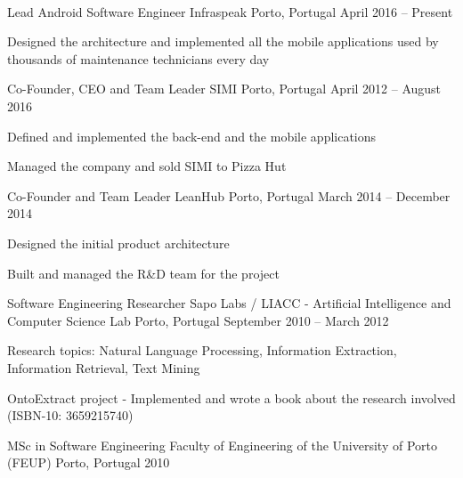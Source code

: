 \documentclass[]{awesome-cv}
\begin{document}
\begin{center}
	  \\
	\vspace{2mm}
\end{center}
\begin{cventries}
	\cventry
	{Lead Android Software Engineer}
	{Infraspeak}
	{Porto, Portugal}
	{April 2016 – Present}
	{\begin{cvitems}
		\item {Designed the architecture and implemented all the mobile applications used by thousands of maintenance technicians every day}
		\end{cvitems}}
	\cventry
	{Co-Founder, CEO and Team Leader}
	{SIMI}
	{Porto, Portugal}
	{April 2012 – August 2016}
	{\begin{cvitems}
		\item {Defined and implemented the back-end and the mobile applications}
		\item {Managed the company and sold SIMI to Pizza Hut}
		\end{cvitems}}
	\cventry
	{Co-Founder and Team Leader}
	{LeanHub}
	{Porto, Portugal}
	{March 2014 – December 2014}
	{\begin{cvitems}
		\item {Designed the initial product architecture}
		\item {Built and managed the R\&D team for the project}
		\end{cvitems}}
	\cventry
	{Software Engineering Researcher}
	{Sapo Labs / LIACC - Artificial Intelligence and Computer Science Lab}
	{Porto, Portugal}
	{September 2010 – March 2012}
	{\begin{cvitems}
		\item {Research topics: Natural Language Processing, Information Extraction, Information Retrieval, Text Mining}
		\item {OntoExtract project - Implemented and wrote a book about the research involved (ISBN-10: 3659215740)}
		\end{cvitems}}
\end{cventries}
\begin{cventries}
	\cventry
	{MSc in Software Engineering}
	{Faculty of Engineering of the University of Porto (FEUP)}
	{Porto, Portugal}
	{2010}
	{}
\end{cventries}
\end{document}
